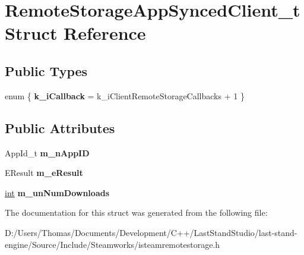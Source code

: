 \hypertarget{structRemoteStorageAppSyncedClient__t}{}\section{Remote\+Storage\+App\+Synced\+Client\+\_\+t Struct Reference}
\label{structRemoteStorageAppSyncedClient__t}
\subsection*{Public Types}
\begin{DoxyCompactItemize}
\item 
\hypertarget{structRemoteStorageAppSyncedClient__t_abc0d2910a60f79b039f28094f58e706a}{}enum \{ {\bfseries k\+\_\+i\+Callback} = k\+\_\+i\+Client\+Remote\+Storage\+Callbacks + 1
 \}\label{structRemoteStorageAppSyncedClient__t_abc0d2910a60f79b039f28094f58e706a}

\end{DoxyCompactItemize}
\subsection*{Public Attributes}
\begin{DoxyCompactItemize}
\item 
\hypertarget{structRemoteStorageAppSyncedClient__t_a69ffe362ce5aacbf6a455c79c12dd405}{}App\+Id\+\_\+t {\bfseries m\+\_\+n\+App\+I\+D}\label{structRemoteStorageAppSyncedClient__t_a69ffe362ce5aacbf6a455c79c12dd405}

\item 
\hypertarget{structRemoteStorageAppSyncedClient__t_a0a52dce225939f7d96db7ab627a080b6}{}E\+Result {\bfseries m\+\_\+e\+Result}\label{structRemoteStorageAppSyncedClient__t_a0a52dce225939f7d96db7ab627a080b6}

\item 
\hypertarget{structRemoteStorageAppSyncedClient__t_ad38050d41af41128d7878daad208bf19}{}\hyperlink{SDL__thread_8h_a6a64f9be4433e4de6e2f2f548cf3c08e}{int} {\bfseries m\+\_\+un\+Num\+Downloads}\label{structRemoteStorageAppSyncedClient__t_ad38050d41af41128d7878daad208bf19}

\end{DoxyCompactItemize}


The documentation for this struct was generated from the following file\+:\begin{DoxyCompactItemize}
\item 
D\+:/\+Users/\+Thomas/\+Documents/\+Development/\+C++/\+Last\+Stand\+Studio/last-\/stand-\/engine/\+Source/\+Include/\+Steamworks/isteamremotestorage.\+h\end{DoxyCompactItemize}
